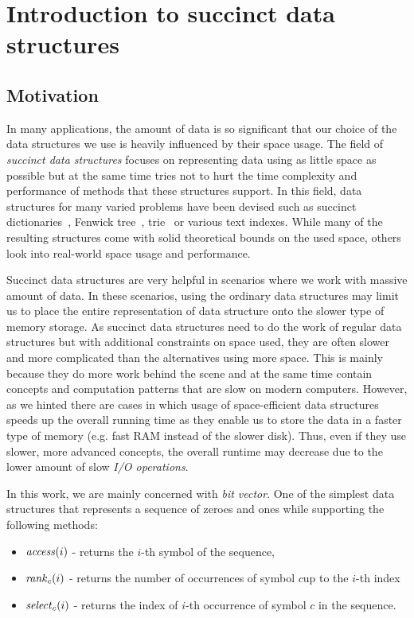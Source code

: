 \chapter{Introduction to succinct data structures}
\label{kap:kap1}


\section{Motivation}

In many applications, the amount of data is so significant that our choice of
the data structures we use is heavily influenced by their space usage. The field
of \textit{succinct data structures} focuses on representing data using as little
space as possible but at the same time tries not to hurt the time complexity and
performance of methods that these structures support. In this field, data structures for many
varied problems have been devised such as succinct dictionaries~\citep{raman2007succinct},
Fenwick tree~\citep{bille2017succinct}, trie~\citep{grossi2015fast} or various text indexes.
While many of the resulting structures come with solid theoretical bounds on the used space,
others look into real-world space usage and performance.

Succinct data structures are very helpful in scenarios where we work with massive
amount of data. In these scenarios, using the ordinary data structures may limit us to place
the entire representation of data structure onto the slower type of memory storage. As succinct
data structures need to do the work of regular data structures but with additional constraints
on space used, they are often slower and more complicated than the alternatives using more
space. This is mainly because they do more work behind the scene and at the same time contain
concepts and computation patterns that are slow on modern computers. However, as we hinted
there are cases in which usage of space-efficient data structures speeds up the overall
running time as they enable us to store the data in a faster type of memory (e.g. fast RAM
instead of the slower disk). Thus, even if they use slower, more advanced concepts, the overall
runtime may decrease due to the lower amount of slow \textit{I/O operations}.

In this work, we are mainly concerned with \textit{bit vector}. One of the simplest
data structures that represents a sequence of zeroes and ones while supporting the
following methods:
\begin{itemize}
\item $\mathit{access}(i)$ - returns the $i$-th symbol of the sequence,
\item $\mathit{rank}_c(i)$ - returns the number of occurrences of symbol $c$up to the $i$-th index
\item $\mathit{select}_c(i)$ - returns the index of $i$-th occurrence of symbol $c$ in the sequence.
\end{itemize}

